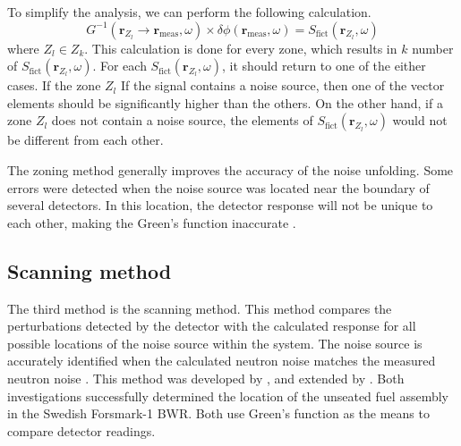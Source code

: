 To simplify the analysis, we can perform the following calculation.
\begin{equation}
    G^{-1}(\textbf{r}_{Z_l} \rightarrow \textbf{r}_{\text{meas}}, \omega) \times \delta \phi (\textbf{r}_{\text{meas}},\omega) = S_{\text{fict}}(\textbf{r}_{Z_l}, \omega)
    \label{eq:zoning_simple}
\end{equation}
where $Z_l \in Z_k$. This calculation is done for every zone, which results in $k$ number of $S_{\text{fict}}(\textbf{r}_{Z_l}, \omega)$. For each $S_{\text{fict}}(\textbf{r}_{Z_l}, \omega)$, it should return to one of the either cases. If the zone $Z_l$ If the signal contains a noise source, then one of the vector elements should be significantly higher than the others. On the other hand, if a zone $Z_l$ does not contain a noise source, the elements of $S_{\text{fict}}(\textbf{r}_{Z_l}, \omega)$ would not be different from each other.

The zoning method generally improves the accuracy of the noise unfolding. Some errors were detected when the noise source was located near the boundary of several detectors. In this location, the detector response will not be unique to each other, making the Green’s function inaccurate \cite{demaziereIdentificationLocalizationAbsorbers2005}.

\subsection{Scanning method}

The third method is the scanning method. This method compares the perturbations detected by the detector with the calculated response for all possible locations of the noise source within the system. The noise source is accurately identified when the calculated neutron noise matches the measured neutron noise \cite{demaziereIdentificationLocalizationAbsorbers2005}. This method was developed by \cite{karlssonLocalizationChannelInstability1999}, and extended by \cite{demaziereDevelopmentNoisebasedMethod2002}. Both investigations successfully determined the location of the unseated fuel assembly in the Swedish Forsmark-1 BWR. Both use Green’s function as the means to compare detector readings.

